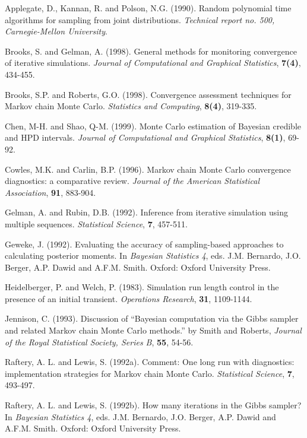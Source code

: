 \documentclass[12pt,letterpaper]{report}
\begin{document}
\begin{thebibliography}{99}
\bibitem{} Applegate, D., Kannan, R. and Polson, N.G. (1990). Random
polynomial time algorithms for sampling from joint distributions.
{\it Technical report no. 500, Carnegie-Mellon University}.

\bibitem{} Brooks, S. and Gelman, A. (1998). General methods for monitoring
convergence of iterative simulations. {\it Journal of Computational and
Graphical Statistics}, {\bf 7(4)}, 434-455.

\bibitem{} Brooks, S.P. and Roberts, G.O. (1998). Convergence assessment
techniques for Markov chain Monte Carlo. {\it Statistics and Computing},
{\bf 8(4)}, 319-335.

\bibitem{} Chen, M-H. and Shao, Q-M. (1999). Monte Carlo estimation of
Bayesian credible and HPD intervals. {\it Journal of Computational
and Graphical Statistics}, {\bf 8(1)}, 69-92.

\bibitem{} Cowles, M.K. and Carlin, B.P. (1996). Markov chain Monte Carlo
convergence diagnostics: a comparative review. {\it Journal of the American
Statistical Association}, {\bf 91}, 883-904.

\bibitem{} Gelman, A. and Rubin, D.B. (1992). Inference from iterative
simulation using multiple sequences. {\it Statistical Science}, {\bf 7},
457-511.

\bibitem{} Geweke, J. (1992). Evaluating the accuracy of sampling-based
approaches to calculating posterior moments. In {\it Bayesian
Statistics 4}, eds. J.M. Bernardo, J.O. Berger, A.P. Dawid and
A.F.M. Smith. Oxford: Oxford University Press.

\bibitem{} Heidelberger, P. and Welch, P. (1983). Simulation run length
control in the presence of an initial transient. {\it Operations Research},
{\bf 31}, 1109-1144.

\bibitem{} Jennison, C. (1993). Discussion of ``Bayesian computation via
the Gibbs sampler and related Markov chain Monte Carlo methods.''
by Smith and Roberts, {\it Journal of the Royal Statistical Society,
Series B}, {\bf 55}, 54-56.

\bibitem{} Raftery, A. L. and Lewis, S. (1992a). Comment: One long run with
diagnostics: implementation strategies for Markov chain Monte Carlo.
{\it Statistical Science}, {\bf 7}, 493-497.

\bibitem{} Raftery, A. L. and Lewis, S. (1992b). How many iterations in the
Gibbs sampler? In {\it Bayesian Statistics 4}, eds. J.M. Bernardo, J.O.
Berger, A.P. Dawid and A.F.M. Smith. Oxford: Oxford University Press.
\end{thebibliography}
\end{document}
